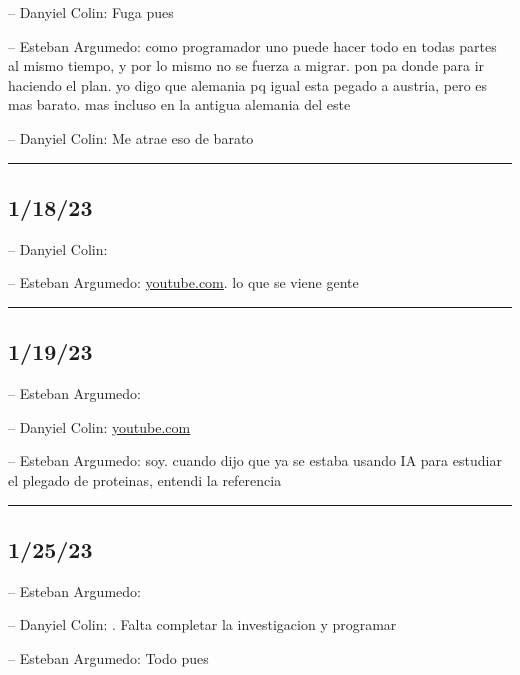 -- Danyiel Colin: Fuga pues

-- Esteban Argumedo: como programador uno puede hacer todo en todas
partes al mismo tiempo, y por lo mismo no se fuerza a migrar. pon pa
donde para ir haciendo el plan. yo digo que alemania pq igual esta
pegado a austria, pero es mas barato. mas incluso en la antigua alemania
del este

-- Danyiel Colin: Me atrae eso de barato

\begin{center}\rule{0.5\linewidth}{0.5pt}\end{center}

\hypertarget{section-178}{%
\subsection{1/18/23}\label{section-178}}

-- Danyiel Colin:

-- Esteban Argumedo:
\href{https://www.youtube.com/watch?v=7V4E_GK1dt8}{youtube.com}. lo que
se viene gente

\begin{center}\rule{0.5\linewidth}{0.5pt}\end{center}

\hypertarget{section-179}{%
\subsection{1/19/23}\label{section-179}}

-- Esteban Argumedo:

-- Danyiel Colin:
\href{https://youtube.com/shorts/VHNbLQ8UTFk?feature=share}{youtube.com}

-- Esteban Argumedo: soy. cuando dijo que ya se estaba usando IA para
estudiar el plegado de proteinas, entendi la referencia

\begin{center}\rule{0.5\linewidth}{0.5pt}\end{center}

\hypertarget{section-180}{%
\subsection{1/25/23}\label{section-180}}

-- Esteban Argumedo:

-- Danyiel Colin: . Falta completar la investigacion y programar

-- Esteban Argumedo: Todo pues

